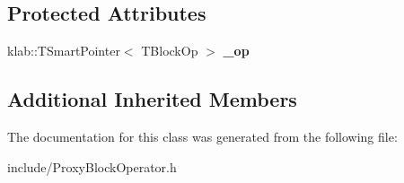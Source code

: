 \subsection*{Protected Attributes}
\begin{DoxyCompactItemize}
\item 
klab\+::\+T\+Smart\+Pointer$<$ T\+Block\+Op $>$ {\bfseries \+\_\+op}\hypertarget{classkl1p_1_1TProxyBlockOperator_aa27fee8b6aa410e7bcfa810ca5617118}{}\label{classkl1p_1_1TProxyBlockOperator_aa27fee8b6aa410e7bcfa810ca5617118}

\end{DoxyCompactItemize}
\subsection*{Additional Inherited Members}


The documentation for this class was generated from the following file\+:\begin{DoxyCompactItemize}
\item 
include/Proxy\+Block\+Operator.\+h\end{DoxyCompactItemize}
